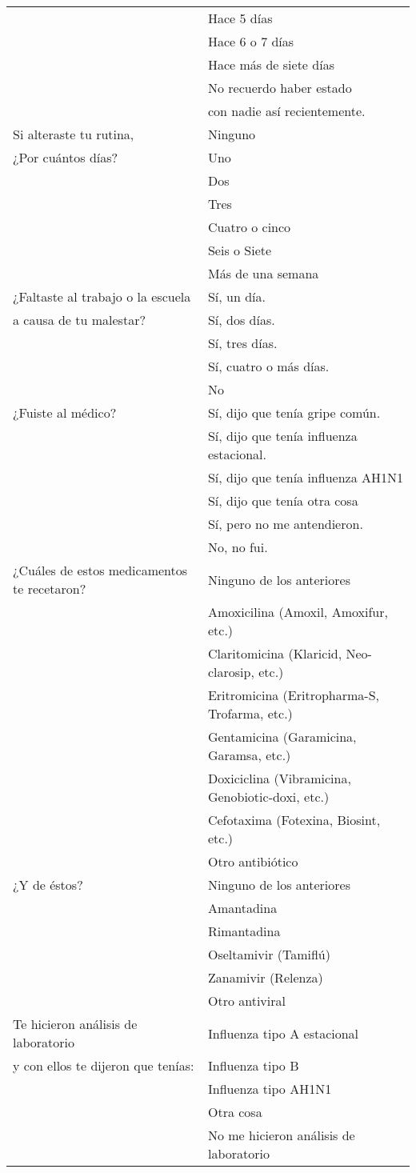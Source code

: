 \documentclass[letterpaper]{article}
\begin{document}
\begin{longtable}{|l|l|}
 & Hace 5 días \\ 
 & Hace 6 o 7 días \\ 
 & Hace más de siete días \\ 
 & No recuerdo haber estado \\
 & con nadie así recientemente. \\ \hline 
Si alteraste tu rutina,  & Ninguno \\ 
¿Por cuántos días? & Uno \\ 
 & Dos \\ 
 & Tres \\ 
 & Cuatro o cinco \\ 
 & Seis o Siete \\ 
 & Más de una semana \\ \hline 
¿Faltaste al trabajo o la escuela & Sí, un día. \\ 
a causa de tu malestar? & Sí, dos días. \\ 
 & Sí, tres días. \\ 
 & Sí, cuatro o más días. \\ 
 & No \\ \hline 
¿Fuiste al médico? & Sí, dijo que tenía gripe común. \\ 
 & Sí, dijo que tenía influenza estacional. \\ 
 & Sí, dijo que tenía influenza AH1N1 \\ 
 & Sí, dijo que tenía otra cosa \\ 
 & Sí, pero no me antendieron. \\ 
 & No, no fui. \\ \hline 
¿Cuáles de estos medicamentos te recetaron? & Ninguno de los anteriores \\ 
 & Amoxicilina (Amoxil, Amoxifur, etc.) \\ 
 & Claritomicina  (Klaricid, Neo-clarosip, etc.) \\ 
 & Eritromicina (Eritropharma-S, Trofarma, etc.) \\ 
 & Gentamicina (Garamicina, Garamsa, etc.) \\ 
 & Doxiciclina (Vibramicina, Genobiotic-doxi, etc.) \\ 
 & Cefotaxima (Fotexina, Biosint, etc.) \\ 
 & Otro antibiótico \\ \hline 
¿Y de éstos? & Ninguno de los anteriores \\ 
 & Amantadina \\ 
 & Rimantadina \\ 
 & Oseltamivir (Tamiflú) \\ 
 & Zanamivir (Relenza) \\ 
 & Otro antiviral \\ \hline 
Te hicieron análisis de laboratorio & Influenza tipo A estacional \\ 
y con ellos te dijeron que tenías: & Influenza tipo B \\ 
 & Influenza tipo AH1N1 \\ 
 & Otra cosa \\ 
 & No me hicieron análisis de laboratorio \\ \hline 
 \end{longtable}
\end{document}
